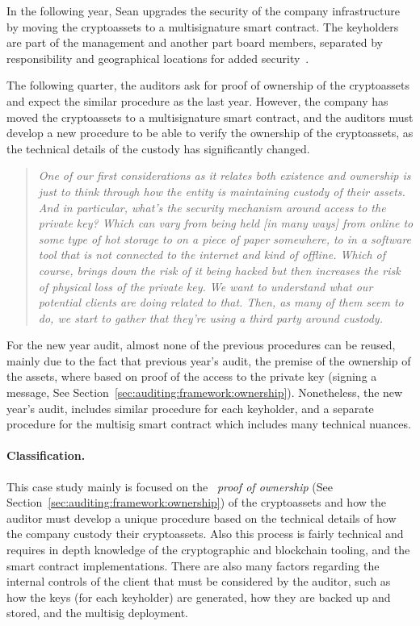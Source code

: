 In the following year, Sean upgrades the security of the company infrastructure by moving the cryptoassets to a multisignature smart contract. The keyholders are part of the management and another part board members, separated by responsibility and geographical locations for added security~\cite{c4ccssa}. 

The following quarter, the auditors ask for proof of ownership of the cryptoassets and expect the similar procedure as the last year. However, the company has moved the cryptoassets to a multisignature smart contract, and the auditors must develop a new procedure to be able to verify the ownership of the cryptoassets, as the technical details of the custody has significantly changed. 

\begin{quote}
	\textit{One of our first considerations as it relates both existence and ownership is just to think through how the entity is maintaining custody of their assets. And in particular, what's the security mechanism around access to the private key? Which can vary from being held [in many ways] from online to some type of hot storage to on a piece of paper somewhere, to in a software tool that is not connected to the internet and kind of offline. Which of course, brings down the risk of it being hacked but then increases the risk of physical loss of the private key. We want to understand what our potential clients are doing related to that. Then, as many of them seem to do, we start to gather that they're using a third party around custody.}~\cite{pimentel2021systemizing}
\end{quote}

For the new year audit, almost none of the previous procedures can be reused, mainly due to the fact that previous year's audit, the premise of the ownership of the assets, where based on proof of the access to the private key (\eg signing a message, See Section~\ref{sec:auditing:framework:ownership}). Nonetheless, the new year's audit, includes similar procedure for each keyholder, and a separate procedure for the multisig smart contract which includes many technical nuances.

\paragraph{Classification.} This case study mainly is focused on the ~\textit{proof of ownership} (See Section~\ref{sec:auditing:framework:ownership}) of the cryptoassets and how the auditor must develop a unique procedure based on the technical details of how the company custody their cryptoassets. Also this process is fairly technical and requires in depth knowledge of the cryptographic and blockchain tooling, and the smart contract implementations. There are also many factors regarding the internal controls of the client that must be considered by the auditor, such as how the keys (for each keyholder) are generated, how they are backed up and stored, and the multisig deployment.


